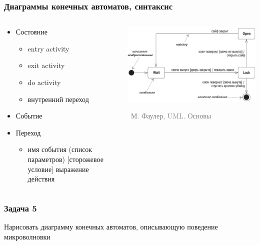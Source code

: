 \documentclass[xetex,mathserif,serif]{beamer}
\newcommand{\attribution}[1] {
	\vspace{-5mm}\begin{flushright}\begin{scriptsize}\textcolor{gray}{\textcopyright\, #1}\end{scriptsize}\end{flushright}
}
\begin{document}
	\begin{frame}
		\frametitle{Диаграммы конечных автоматов, синтаксис}
		\begin{columns}
			\begin{column}{0.5\textwidth}
				\begin{itemize}
					\item Состояние
					\begin{itemize}
						\item entry activity
						\item exit activity
						\item do activity
						\item внутренний переход
					\end{itemize}
					\item Событие
					\item Переход
					\begin{itemize}
						\item имя события (список параметров) [сторожевое условие] выражение действия
					\end{itemize}
				\end{itemize}
			\end{column}
			\begin{column}{0.5\textwidth}
				\begin{center}
					\includegraphics[width=\textwidth]{stateTransitionSyntax.png}
					\attribution{М. Фаулер, UML. Основы}
				\end{center}
			\end{column}
		\end{columns}
	\end{frame}

	\begin{frame}
		\frametitle{Задача 5}
		Нарисовать диаграмму конечных автоматов, описывающую поведение микроволновки
	\end{frame}
\end{document}
